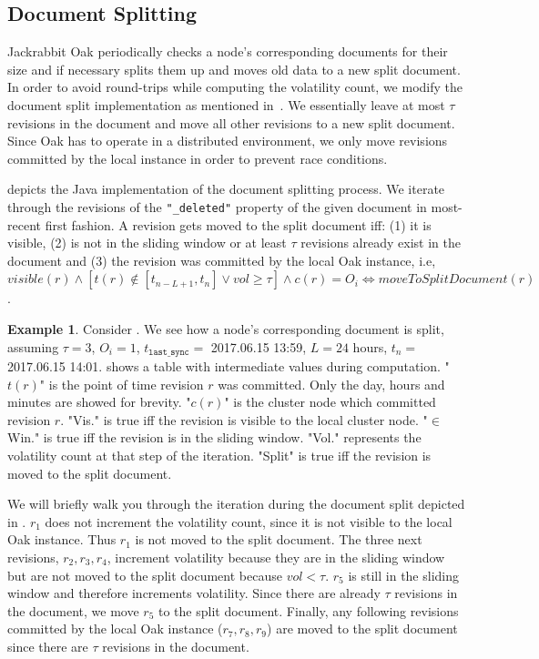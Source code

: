 \documentclass[abstracton,12pt]{scrartcl}
\theoremstyle{definition}
\newtheorem{example}{Example}
\begin{document}
\subsection{Document Splitting}

Jackrabbit Oak periodically checks a node's corresponding documents for their size and if necessary splits them up and moves old data to a new split document.
In order to avoid round-trips while computing the volatility count, we modify the document split implementation as mentioned in~\cite{KW17}.
We essentially leave at most $\tau$ revisions in the document and move all other revisions to a new split document.
Since Oak has to operate in a distributed environment, we only move revisions committed by the local instance in order to prevent race conditions.

 depicts the Java implementation of the document splitting process.
We iterate through the revisions of the \texttt{"\_deleted"} property of the given document in most-recent first fashion.
A revision gets moved to the split document iff: (1) it is visible, (2) is not in the sliding window or at least $\tau$ revisions already exist in the document and (3) the revision was committed by the local Oak instance, 
i.e, $visible(r) \land [t(r) \notin [t_{n-L+1},t_n] \lor vol \geq \tau] \land c(r) = O_i \iff moveToSplitDocument(r)$.

\begin{example}
    \label{ex:split_doc}
    Consider .
    We see how a node's corresponding document is split, assuming $\tau = 3$, $O_i = 1$, $t_{\texttt{last\_sync}} = $ {\footnotesize 2017.06.15 13:59}, $L = 24$ hours, $t_n = $ {\footnotesize 2017.06.15 14:01}.
     shows a table with intermediate values during computation.
    "$t(r)$" is the point of time revision $r$ was committed. Only the day, hours and minutes are showed for brevity.
    "$c(r)$" is the cluster node which committed revision $r$.
    "Vis." is true iff the revision is visible to the local cluster node.
    "$\in$Win." is true iff the revision is in the sliding window.
    "Vol." represents the volatility count at that step of the iteration. 
    "Split" is true iff the revision is moved to the split document.

    We will briefly walk you through the iteration during the document split depicted in .
    $r_1$ does not increment the volatility count, since it is not visible to the local Oak instance.
    Thus $r_1$ is not moved to the split document.
    The three next revisions, $r_2,r_3,r_4$, increment volatility because they are in the sliding window but are not moved to the split document because $vol < \tau$.
    $r_5$ is still in the sliding window and therefore increments volatility.
    Since there are already $\tau$ revisions in the document, we move $r_5$ to the split document.
    Finally, any following revisions committed by the local Oak instance ($r_7, r_8, r_9$) are moved to the split document since there are $\tau$ revisions in the document.
\end{example}
\end{document}
